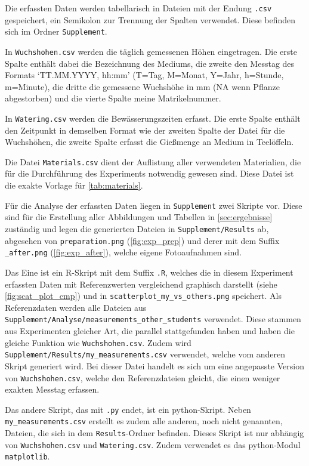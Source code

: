     \newpage
    Die erfassten Daten werden tabellarisch in Dateien mit der Endung \texttt{.csv} gespeichert, ein Semikolon zur Trennung der Spalten verwendet. Diese befinden sich im Ordner \texttt{Supplement}.

    In \texttt{Wuchshohen.csv} werden die täglich gemessenen Höhen eingetragen. Die erste Spalte enthält dabei die Bezeichnung des Mediums, die zweite den Messtag des Formats `TT.MM.YYYY, hh:mm' (T=Tag, M=Monat, Y=Jahr, h=Stunde, m=Minute), die dritte die gemessene Wuchshöhe in mm (NA wenn Pflanze abgestorben) und die vierte Spalte meine Matrikelnummer.

    In \texttt{Watering.csv} werden die Bewässerungszeiten erfasst. Die erste Spalte enthält den Zeitpunkt in demselben Format wie der zweiten Spalte der Datei für die Wuchshöhen, die zweite Spalte erfasst die Gießmenge an Medium in Teelöffeln.

    Die Datei \texttt{Materials.csv} dient der Auflistung aller verwendeten Materialien, die für die Durchführung des Experiments notwendig gewesen sind. Diese Datei ist die exakte Vorlage für \autoref{tab:materials}.

    Für die Analyse der erfassten Daten liegen in \texttt{Supplement} zwei Skripte vor. Diese sind für die Erstellung aller Abbildungen und Tabellen in \autoref{sec:ergebnisse} zuständig und legen die generierten Dateien in \texttt{Supplement/Results} ab, abgesehen von \texttt{preparation.png} (\autoref{fig:exp_prep}) und derer mit dem Suffix \texttt{\_after.png} (\autoref{fig:exp_after}), welche eigene Fotoaufnahmen sind.

    Das Eine ist ein R-Skript mit dem Suffix \texttt{.R}, welches die in diesem Experiment erfassten Daten mit Referenzwerten vergleichend graphisch darstellt (siehe \autoref{fig:scat_plot_cmp}) und in \texttt{scatterplot\_my\_vs\_others.png} speichert. Als Referenzdaten werden alle Dateien aus \texttt{Supplement/Analyse/measurements\_other\_students} verwendet. Diese stammen aus Experimenten gleicher Art, die parallel stattgefunden haben und haben die gleiche Funktion wie \texttt{Wuchshohen.csv}. Zudem wird \texttt{Supplement/Results/my\_measurements.csv} verwendet, welche vom anderen Skript generiert wird. Bei dieser Datei handelt es sich um eine angepasste Version von \texttt{Wuchshohen.csv}, welche den Referenzdateien gleicht, die einen weniger exakten Messtag erfassen.

    Das andere Skript, das mit \texttt{.py} endet, ist ein python-Skript. Neben \texttt{my\_measurements.csv} erstellt es zudem alle anderen, noch nicht genannten, Dateien, die sich in dem \texttt{Results}-Ordner befinden. Dieses Skript ist nur abhängig von \texttt{Wuchshohen.csv} und \texttt{Watering.csv}. Zudem verwendet es das python-Modul \texttt{matplotlib}.

